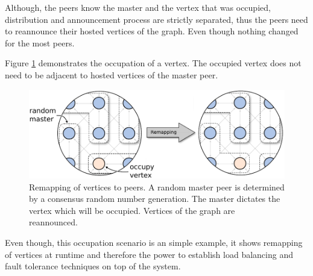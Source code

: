 Although, the peers know the master and the vertex that was
occupied, distribution and announcement process are strictly
separated, thus the peers need to reannounce their hosted vertices
of the graph. Even though nothing changed for the most peers.


Figure \ref{fig:gol_remapping} demonstrates the occupation of a
vertex.  The occupied vertex does not need to be adjacent to hosted
vertices of the master peer.

  \begin{figure}[H]
    \centering
    \includegraphics[width=\textwidth]{graphics/40_gol_remapping}
    \caption{Remapping of vertices to peers. A random master peer is
      determined by a consensus random number generation. The master
      dictates the vertex which will be occupied. Vertices of the
      graph are reannounced.}
    \label{fig:gol_remapping}
  \end{figure}



Even though, this occupation scenario is an simple example, it
shows remapping of vertices at runtime and therefore the power
to establish load balancing and fault tolerance techniques on
top of the system.

\cleardoublepage

